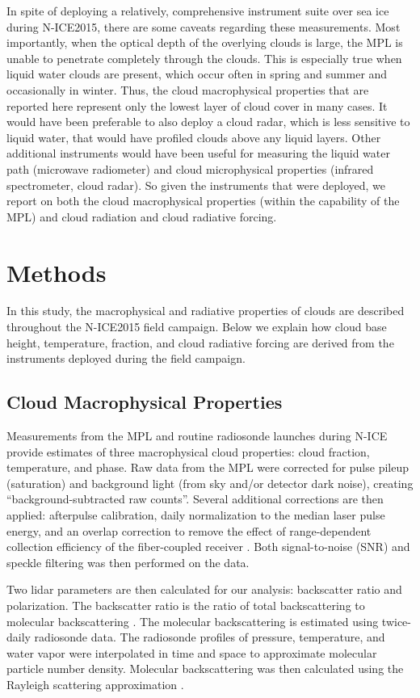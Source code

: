 In spite of deploying a relatively, comprehensive instrument suite over sea ice during N-ICE2015, there are some caveats regarding these measurements. Most importantly, when the optical depth of the overlying clouds is large, the MPL is unable to penetrate completely through the clouds. This is especially true when liquid water clouds are present, which occur often in spring and summer and occasionally in winter. Thus, the cloud macrophysical properties that are reported here represent only the lowest layer of cloud cover in many cases. It would have been preferable to also deploy a cloud radar, which is less sensitive to liquid water, that would have profiled clouds above any liquid layers. Other additional instruments would have been useful for measuring the liquid water path (microwave radiometer) and cloud microphysical properties (infrared spectrometer, cloud radar). So given the instruments that were deployed, we report on both the cloud macrophysical properties (within the capability of the MPL) and cloud radiation and cloud radiative forcing. 

\section{Methods}
In this study, the macrophysical and radiative properties of clouds are described throughout the N-ICE2015 field campaign. Below we explain how cloud base height, temperature, fraction, and cloud radiative forcing are derived from the instruments deployed during the field campaign.

\subsection{Cloud Macrophysical Properties}
Measurements from the MPL and routine radiosonde launches during N-ICE provide estimates of three macrophysical cloud properties: cloud fraction, temperature, and phase. Raw data from the MPL were corrected for pulse pileup (saturation) and background light (from sky and/or detector dark noise), creating “background-subtracted raw counts”. Several additional corrections are then applied: afterpulse calibration, daily normalization to the median laser pulse energy, and an overlap correction to remove the effect of range-dependent collection efficiency of the fiber-coupled receiver  \citep{campbell:2002, micropulse:2006}. Both signal-to-noise (SNR) and speckle filtering was then performed on the data.

Two lidar parameters are then calculated for our analysis: backscatter ratio and polarization. The backscatter ratio is the ratio of total backscattering to molecular backscattering \citep{klett:1981}. The molecular backscattering is estimated using twice-daily radiosonde data. The radiosonde profiles of pressure, temperature, and water vapor were interpolated in time and space to approximate molecular particle number density. Molecular backscattering was then calculated using the Rayleigh scattering approximation \citep{bohren:2006, bohren:2008, placzek:1934}. 

